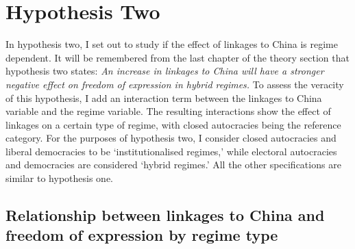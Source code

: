 \section{Hypothesis Two} \label{sec:h2}
In hypothesis two, I set out to study if the effect of linkages to China is regime dependent. It will be remembered from the last chapter of the theory section that hypothesis two states: \textit{An increase in linkages to China will have a stronger negative effect on freedom of expression in hybrid regimes.} To assess the veracity of this hypothesis, I add an interaction term between the linkages to China variable and the regime variable. The resulting interactions show the effect of linkages on a certain type of regime, with closed autocracies being the reference category. For the purposes of hypothesis two, I consider closed autocracies and liberal democracies to be `institutionalised regimes,' while electoral autocracies and democracies are considered `hybrid regimes.' All the other specifications are similar to hypothesis one. 

\subsection{Relationship between linkages to China and freedom of expression by regime type}

